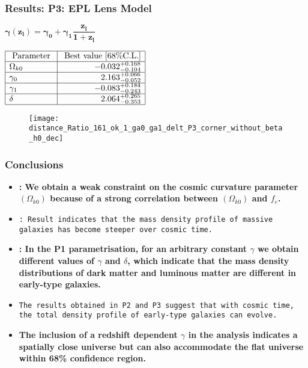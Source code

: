 \documentclass[10pt,xcolor={dvipsnames}]{beamer}
\begin{document}
\begin{frame}
 \frametitle{Results: \textbf{ P3: EPL} Lens Model}
\begin{scriptsize}
$
{\boxed{\boldsymbol{\gamma(z_l)=\gamma_{0}+\gamma_{1} \dfrac{z_{l}}{1+z_{l}}}}}
$
\end{scriptsize}\hspace*{1cm} $\begin{array}{|l|r|}\hline \text { Parameter } & {\text { Best value }[68 \% \mathrm{C.L.}]} \\ \hline \Omega_{k 0} & {-0.032^{+0.168}_{-0.104}} \\ \hline \gamma_{0} & {2.163^{+0.066}_{-0.052}} \\ \hline \gamma_{1} & {-0.083^{+0.184}_{-0.243}} \\ \hline \delta & {2.064^{+0.265}_{-0.353}} \\ \hline\end{array}$



\begin{figure}[ht!]
\centering
\texttt{[image: distance\_Ratio\_161\_ok\_1\_ga0\_ga1\_delt\_P3\_corner\_without\_beta\_h0\_dec]}
\end{figure} 
\end{frame}
\begin{frame}
 \frametitle{Conclusions}
 \begin{itemize}
 \item
 \textbf{\small {\color{red}{SIS model}}: We obtain a weak constraint on the cosmic curvature parameter $(\Omega_{k0})$ because of a strong correlation between $(\Omega_{k0})$ and $f_e$.}
 \item
\texttt{\small {\color{red}{PLS model}}: Result indicates that the mass density profile of massive galaxies has become steeper over cosmic time.}
\vspace{1mm}\\
\item
\textbf{\small {\color{red}{EPL model}}: In the P1 parametrisation, for an arbitrary constant $\gamma$ we obtain different values of $\gamma$ and $\delta$, which indicate that the mass density distributions of dark matter and luminous matter are different in early-type galaxies.}
\vspace{1mm}\\
\item
\texttt{\small The results obtained in P2 and P3 suggest that with cosmic time, the total density profile of early-type galaxies can evolve. }
\vspace{1mm}\\
\item
\textbf{\small The inclusion of a redshift dependent $\gamma$ in the analysis indicates a spatially close universe but can also accommodate the flat universe within 68\% confidence region.}

 \end{itemize}
 
 \end{frame}
\end{document}
